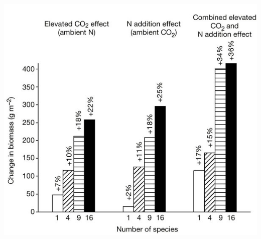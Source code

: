 \begin{frame}[t]
    \begin{adjustwidth}{-2em}{-1.5em}
        \vspace{-3mm}
        \centerline{
            \includegraphics[height=0.95\textheight]{diversity-biomass-addition-data.jpg}}

        \vspace{-4mm}
    \end{adjustwidth}
\end{frame}

